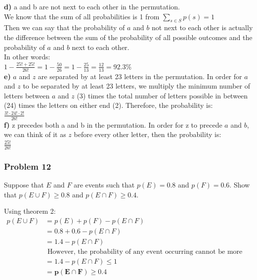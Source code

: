 \documentclass[fontsize=11pt]{scrartcl} %
\begin{document}
\textbf{d)} a and b are not next to each other in the permutation.\\
We know that the sum of all probabilities is 1 from 
$\displaystyle\sum_{s\in S} p(s) = 1$\\

Then we can say that the probability of $a$ and $b$ not next to each other is actually the difference between the sum of the probability of all possible outcomes and the probability of $a$ and $b$ next to each other.\\
In other words:\\
$1 - \frac{25!+25!}{26!} = 1 - \frac{50}{26} = 1 - \frac{25}{13} = \frac{12}{13} = 92.3\%$\\


\textbf{e)} $a$ and $z$ are separated by at least 23 letters in the permutation.
In order for $a$ and $z$ to be separated by at least 23 letters, we multiply the minimum number of letters between $a$ and $z$ (3) times the total number of letters possible in between (24) times the letters on either end (2). Therefore, the probability is:\\
$\frac{3!\cdot24!\cdot2!}{26!}$\\

\textbf{f)} z precedes both a and b in the permutation.
In order for z to precede $a$ and $b$, we can think of it as $z$ before every other letter, then the probability is:\\
$\frac{25!}{26!}$\\

\subsubsection*{Problem 12}
Suppose that $E$ and $F$ are events such that $p(E) = 0.8$ and $p(F)=0.6$. Show that $p(E\cup F) \ge 0.8$ and $p(E \cap F ) \ge 0.4$.

Using theorem 2:\\
\begin{align*}
p(E \cup F) &= p(E) + p(F) - p(E \cap F)\\
 			&= 0.8 + 0.6 - p(E \cap F)\\
		 	&= 1.4 - p(E \cap F)\\
 			&\text{  However, the probability of any event occurring cannot be more than 1, thus:}  \\
 			&= 1.4 - p(E \cap F) \le 1\\
            &= \mathbf{p(E \cap F) \ge 0.4}
\end{align*}
\end{document}
